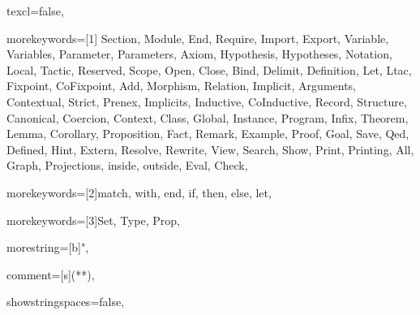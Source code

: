 
 {
texcl=false,

morekeywords=[1]{
Section, Module, End, Require, Import, Export,
Variable, Variables, Parameter, Parameters, Axiom, Hypothesis, Hypotheses,
Notation, Local, Tactic, Reserved, Scope, Open, Close, Bind, Delimit,
Definition, Let, Ltac, Fixpoint, CoFixpoint, Add, Morphism, Relation,
Implicit, Arguments, Contextual, Strict, Prenex, Implicits,
Inductive, CoInductive, Record, Structure, Canonical, Coercion,
Context, Class, Global, Instance, Program, Infix,
Theorem, Lemma, Corollary, Proposition, Fact, Remark, Example,
Proof, Goal, Save, Qed, Defined, Hint, Extern, Resolve, Rewrite, View,
Search, Show, Print, Printing, All, Graph, Projections, inside, outside, Eval,
Check},

morekeywords=[2]{match, with, end, if, then, else, let},

morekeywords=[3]{Set, Type, Prop},





morestring=[b]{"},

comment=[s]{(*}{*)},

showstringspaces=false,

}
